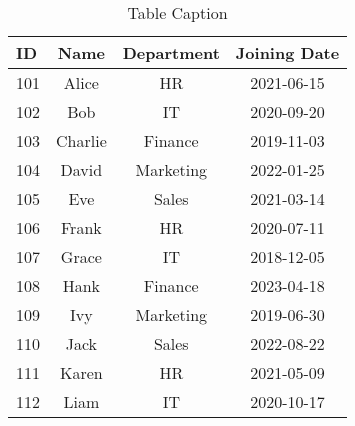 \documentclass{article}
\begin{document}
\begin{table}[h!]
\centering
\caption{Table Caption}
\label{tab:label}
\begin{tabular}{lccc}
\toprule
ID & Name & Department & Joining Date \\
\midrule
101 & Alice & HR & 2021-06-15 \\
102 & Bob & IT & 2020-09-20 \\
103 & Charlie & Finance & 2019-11-03 \\
104 & David & Marketing & 2022-01-25 \\
105 & Eve & Sales & 2021-03-14 \\
106 & Frank & HR & 2020-07-11   \\
107 & Grace & IT & 2018-12-05   \\
108 & Hank & Finance & 2023-04-18   \\
109 & Ivy & Marketing & 2019-06-30   \\
110 & Jack & Sales & 2022-08-22   \\
111 & Karen & HR & 2021-05-09   \\
112 & Liam & IT & 2020-10-17  \\
\bottomrule
\end{tabular}
\end{table}
\end{document}
